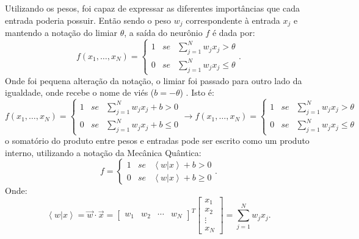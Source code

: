 Utilizando os pesos, foi capaz de expressar as diferentes importâncias que cada entrada poderia possuir. Então sendo o peso $w_j$ correspondente à entrada $x_j$ e mantendo a notação do limiar $\theta$, a saída do neurônio $f$ é dada por:
\begin{equation}f\left(x_{1},\dots,x_{N}\right)=\left\{ \begin{array}{ccc}
1 & se & \sum_{j=1}^{N}w_{j}x_{j}>\theta\\
0 & se & \sum_{j=1}^{N}w_{j}x_{j}\leq\theta
\end{array}\right. . \end{equation}
Onde foi pequena alteração da notação, o limiar foi passado para outro lado da igualdade, onde recebe o nome de viés ($b=-\theta$) . Isto é:
\begin{equation}
f\left(x_{1},\dots,x_{N}\right)=\left\{ \begin{array}{ccc}
1 & se & \sum_{j=1}^{N}w_{j}x_{j}+b>0\\
0 & se & \sum_{j=1}^{N}w_{j}x_{j}+b\leq0
\end{array}\right.\rightarrow f\left(x_{1},\dots,x_{N}\right)=\left\{ \begin{array}{ccc}
1 & se & \sum_{j=1}^{N}w_{j}x_{j}>\theta\\
0 & se & \sum_{j=1}^{N}w_{j}x_{j}\leq\theta
\end{array}\right.
\end{equation}
o somatório do produto entre pesos e entradas pode ser escrito como um produto interno, utilizando a notação da Mecânica Quântica:
\begin{equation}f=\left\{ \begin{array}{ccc}
1 & se & \left\langle w|x\right\rangle +b>0\\
0 & se & \left\langle w|x\right\rangle +b\geq0
\end{array}\right. . \end{equation}
Onde:
\begin{equation}\left\langle w|x\right\rangle =\overrightarrow{w}\cdot\overrightarrow{x}=\left[\begin{array}{cccc}
w_{1} & w_{2} & \cdots & w_{N}\end{array}\right]^{T}\left[\begin{array}{c}
x_{1}\\
x_{2}\\
\vdots\\
x_{N}
\end{array}\right]=\sum_{j=1}^{N}w_{j}x_{j} .\end{equation}
